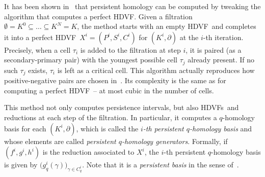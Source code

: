 \documentclass[runningheads]{llncs}
\newcommand{\dr}{\partial}
\newcommand{\HC}{HDVF}
\newcommand{\HCs}{HDVFs}
\begin{document}
    It has been shown in~\cite{aldo-cycles_discrete_morse_theory} that persistent homology can be computed by tweaking the algorithm that computes a perfect \HC. 
    Given a filtration $\emptyset = K^0 \subseteq \dots \subseteq K^N = K$, the method starts with an empty \HC\ and completes it into a perfect \HC\ $X^i = (P^i, S^i, C^i)$ for $(K^i,\dr)$ at the $i$-th iteration.
    Precisely, when a cell $\tau_i$ is added to the filtration at step $i$, it is paired (as a secondary-primary pair) with the youngest possible cell $\tau_j$ already present.
    If no such $\tau_j$ exists, $\tau_i$ is left as a critical cell.
    This algorithm actually reproduces how positive-negative pairs are chosen in~\cite{edelsbrunner-persistence_simplification}.
    Its complexity is the same as for computing a perfect \HC\ -- at most cubic in the number of cells.

    This method not only computes persistence intervals, but also \HCs\ and reductions at each step of the filtration.
    In particular, %
    it computes a $q$-homology basis for each $(K^i,\dr)$, which is called the \textit{$i$-th persistent $q$-homology basis} and whose elements are called \textit{persistent $q$-homology generators}.
    Formally, if $(f^i,g^i,h^i)$ is the reduction associated to $X^i$, the $i$-th persistent $q$-homology basis is given by $\bigl(g^i_q(\gamma)\bigl)_{\gamma \in C^i_q}$.
    Note that it is a \textit{persistent basis} in the sense of~\cite{kdey-persistent_1_cycles,wu-optimal_cycles_cardiac,obayashi-tightest_representative_persistent}.
\end{document}
